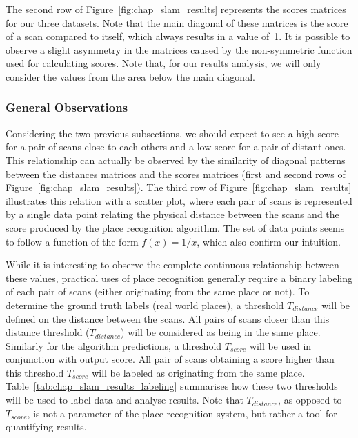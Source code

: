 The second row of Figure~\ref{fig:chap_slam_results} represents the scores matrices for our three datasets. Note that the main diagonal of these matrices is the score of a scan compared to itself, which always results in a value of~1. It is possible to observe a slight asymmetry in the matrices caused by the non-symmetric function used for calculating scores. Note that, for our results analysis, we will only consider the values from the area below the main diagonal.


\subsubsection{General Observations}
\label{ssec:chap_slam_results_evaluation}

Considering the two previous subsections, we should expect to see a high score for a pair of scans close to each others and a low score for a pair of distant ones. This relationship can actually be observed by the similarity of diagonal patterns between the distances matrices and the scores matrices (first and second rows of Figure~\ref{fig:chap_slam_results}). The third row of Figure~\ref{fig:chap_slam_results} illustrates this relation with a scatter plot, where each pair of scans is represented by a single data point relating the physical distance between the scans and the score produced by the place recognition algorithm. The set of data points seems to follow a function of the form $f(x) = 1 / x$, which also confirm our intuition.

While it is interesting to observe the complete continuous relationship between these values, practical uses of place recognition generally require a binary labeling of each pair of scans (either originating from the same place or not). To determine the ground truth labels (real world places), a threshold $T_{distance}$ will be defined on the distance between the scans. All pairs of scans closer than this distance threshold ($T_{distance}$) will be considered as being in the same place. Similarly for the algorithm predictions, a threshold $T_{score}$ will be used in conjunction with output score. All pair of scans obtaining a score higher than this threshold $T_{score}$ will be labeled as originating from the same place. Table~\ref{tab:chap_slam_results_labeling} summarises how these two thresholds will be used to label data and analyse results. Note that $T_{distance}$, as opposed to $T_{score}$, is not a parameter of the place recognition system, but rather a tool for quantifying results. 

